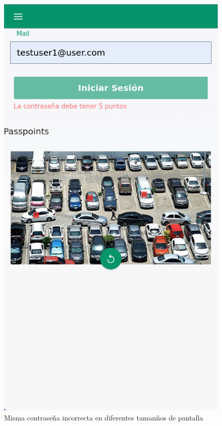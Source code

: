 \begin{anexos}
\begin{figure}[H]
\begin{minipage}[b]{0.68\linewidth}
	\end{minipage}%
	\hfill
	\begin{minipage}[b]{0.3\linewidth} %
		\centering
		\includegraphics[width=\linewidth]{Graphics/capturas/login-error-mobile.png}
		
	\end{minipage}
	\caption{Misma contrase\~na incorrecta en diferentes taman\~nos de pantalla }
		\label{error-scans}
\end{figure}




\end{anexos}

